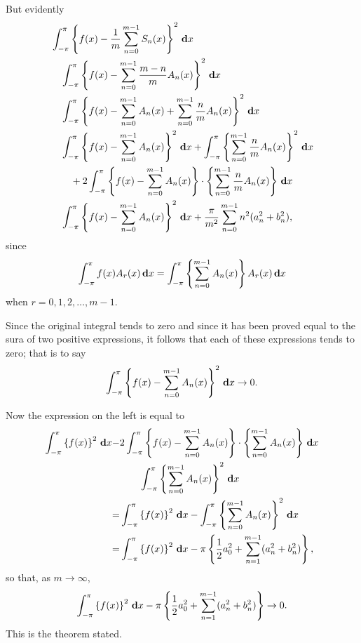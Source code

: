 But evidently
\begin{align*}
  &
  \int_{-\pi}^{\pi}
  \left\{ 
    f(x)
    -
    \frac{1}{m}
    \sum_{n=0}^{m-1} S_{n}(x)
   \right\}^{2} \, \mathbf{d} x
  \\
  &\quad
  \int_{-\pi}^{\pi}
  \left\{ 
    f(x)
    -
    \sum_{n=0}^{m-1}
    \frac{m-n}{m}
    A_{n}(x)
   \right\}^{2} \, \mathbf{d} x
  \\
  &\quad
  \int_{-\pi}^{\pi}
  \left\{ 
    f(x)
    -
    \sum_{n=0}^{m-1}
    A_{n}(x)
    +
    \sum_{n=0}^{m-1}
    \frac{n}{m}
    A_{n}(x)
   \right\}^{2} \, \mathbf{d} x
  \\
  &\quad
  \int_{-\pi}^{\pi}
  \left\{ 
    f(x)
    -
    \sum_{n=0}^{m-1}
    A_{n}(x)
   \right\}^{2} \, \mathbf{d} x
  +
  \int_{-\pi}^{\pi}
  \left\{ 
    \sum_{n=0}^{m-1}
    \frac{n}{m}
    A_{n}(x)
   \right\}^{2} \, \mathbf{d} x
  \\
  &\quad\quad
  +
  2
  \int_{-\pi}^{\pi}
  \left\{ 
    f(x)
    -
    \sum_{n=0}^{m-1}
    A_{n}(x)
   \right\}
  \cdot
  \left\{ 
    \sum_{n=0}^{m-1}
    \frac{n}{m}
    A_{n}(x)
   \right\} \, \mathbf{d} x
  \\
  &\quad
    \int_{-\pi}^{\pi}
    \left\{ 
      f(x)
      -
      \sum_{n=0}^{m-1}
      A_{n}(x)
     \right\}^{2} \, \mathbf{d} x
    +
    \frac{\pi}{m^{2}}
    \sum_{n=0}^{m-1}
    n^{2} (a_{n}^{2} + b_{n}^{2}),
\end{align*}
%
%
since
$$
\int_{-\pi}^{\pi}
f(x) A_{r}(x) \, \mathbf{d} x
=
\int_{-\pi}^{\pi}
\left\{ 
  \sum_{n=0}^{m-1}
  A_{n}(x)
 \right\}
A_{r}(x)
\, \mathbf{d} x
$$
when $r = 0,1,2,\ldots,m-1$.

Since the original integral tends to zero and since it has been proved
equal to the sura of two positive expressions, it follows that each of
these expressions tends to zero; that is to say
$$
\int_{-\pi}^{\pi}
\left\{ 
  f(x)
  -
  \sum_{n=0}^{m-1}
  A_{n}(x)
 \right\}^{2} \, \mathbf{d} x
\rightarrow
0.
$$

Now the expression on the left is equal to
\begin{align*}
  \int_{-\pi}^{\pi}
  \left\{ 
    f(x)
   \right\}^{2} \, \mathbf{d} x
  -&
  2
  \int_{-\pi}^{\pi}
  \left\{ 
    f(x)
    -
    \sum_{n=0}^{m-1}
    A_{n}(x)
   \right\}
  \cdot
  \left\{ 
    \sum_{n=0}^{m-1}
    A_{n}(x)
   \right\}
  \, \mathbf{d} x
  \\
  &\quad\quad
  \int_{-\pi}^{\pi}
  \left\{ 
    \sum_{n=0}^{m-1}
    A_{n}(x)
   \right\}^{2}
  \, \mathbf{d} x
  \\
  =&
  \int_{-\pi}^{\pi}
  \left\{ 
    f(x)
   \right\}^{2}
  \, \mathbf{d} x
  -
  \int_{-\pi}^{\pi}
  \left\{ 
    \sum_{n=0}^{m-1}
    A_{n}(x)
   \right\}^{2}
  \, \mathbf{d} x
  \\
  =&
  \int_{-\pi}^{\pi}
  \left\{ 
    f(x)
   \right\}^{2}
  \, \mathbf{d} x
  -
  \pi
  \left\{ 
    \frac{1}{2} a_{0}^{2}
    +
    \sum_{n=1}^{m-1}
    (a_{n}^{2} + b_{n}^{2})
   \right\}
  ,
\end{align*}
so that, as $m \rightarrow \infty$,
$$
\int_{-\pi}^{\pi}
\left\{ 
  f(x)
 \right\}^{2}
\, \mathbf{d} x
-
\pi
\left\{ 
  \frac{1}{2} a_{0}^{2}
  +
  \sum_{n=1}^{m-1}
  (a_{n}^{2} + b_{n}^{2})
 \right\}
\rightarrow
0.
$$
This is the theorem stated.

